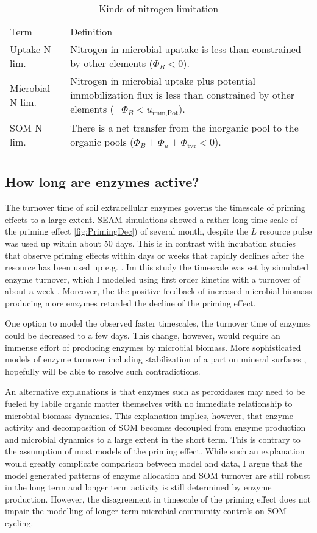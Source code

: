 \begin{table}[t]
\caption{Kinds of nitrogen limitation \label{tab:NutrientLimDefs}}
\centering
\begin{tabular}{lp{5.5cm}}
\tophline
Term &  Definition \\
\middlehline
Uptake N lim. & Nitrogen in microbial upatake is less than 
constrained by other elements (${\Phi_B < 0}$).
\\
Microbial N lim. & Nitrogen in microbial uptake plus potential
immobilization flux is less than constrained by other elements (${-\Phi_B <
u_{\operatorname{imm,Pot}}}$).
\\
SOM N lim. & There is a net transfer from the inorganic pool to
the organic pools (${\Phi_B+\Phi_u+\Phi_{\operatorname{tvr}}<0}$).
\\
\bottomhline
\end{tabular}
\end{table}
 


\subsection{How long are enzymes active?}
The turnover time of soil extracellular enzymes governs the timescale of priming
effects to a large extent. SEAM simulations showed a rather long time scale of
the priming effect \ref{fig:PrimingDec}) of several month, despite the $L$
resource pulse was used up within about 50 days. This is in contrast with
incubation studies that observe priming effects within days or weeks that
rapidly declines after the resource has been used up e.g.
\citep{Blagodatskaya14}.
Im this study the timescale was set by simulated enzyme turnover, which I
modelled using first order kinetics with a turnover of about a week
\citep{Burns13}. Moreover, the the positive feedback of increased microbial
biomass producing more enzymes retarded the decline of the priming effect.

One option to model the observed faster timescales, the turnover time of enzymes
could be decreased to a few days.
This change, however, would require an immense effort of producing enzymes by
microbial biomass. More sophisticated models of enzyme turnover
including stabilization of a part on mineral surfaces \citep{Burns13},
hopefully will be able to resolve such contradictions.

An alternative explanations is that enzymes such as peroxidases may need to be
fueled by labile organic matter themselves \citep{Rousk14} with no immediate
relationship to microbial biomass dynamics.
This explanation implies, however, that enzyme activity and decomposition of SOM
becomes decoupled from enzyme production and microbial dynamics to a large
extent in the short term.
This is contrary to the assumption of most models of the priming effect. While
such an explanation would greatly complicate comparison between model and data,
I argue that the model generated patterns of enzyme allocation and SOM turnover
are still robust in the long term and longer term activity is still determined
by enzyme production. However, the disagreement in timescale of the
priming effect does not impair the modelling of longer-term microbial community
controls on SOM cycling.

